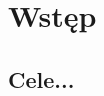 \setcounter{page}{1}
%
\renewcommand{\chaptername}{Rozdział}
\chapter{Wstęp}
\label{chap:intro}


\section{Cele...}


